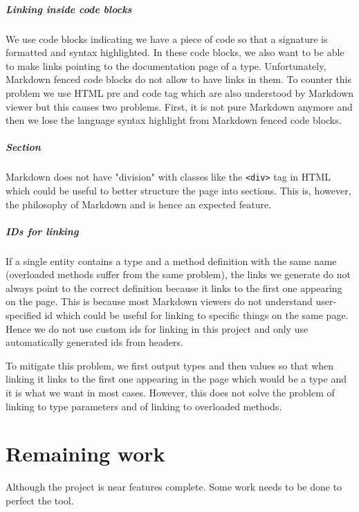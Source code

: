 \documentclass{report}
\begin{document}
\paragraph{Linking inside code blocks}
We use code blocks indicating we have a piece of code so that a signature is formatted and syntax highlighted. In these code blocks, we also want to be able to make links pointing to the documentation page of a type. Unfortunately, Markdown fenced code blocks do not allow to have links in them. To counter this problem we use HTML pre and code tag which are also understood by Markdown viewer but this causes two problems. First, it is not pure Markdown anymore and then we lose the language syntax highlight from Markdown fenced code blocks.

\paragraph{Section}
Markdown does not have "division" with classes like the \texttt{<div>} tag in HTML which could be useful to better structure the page into sections. This is, however, the philosophy of Markdown and is hence an expected feature.

\paragraph{IDs for linking}
If a single entity contains a type and a method definition with the same name (overloaded methods suffer from the same problem), the links we generate do not always point to the correct definition because it links to the first one appearing on the page. This is because most Markdown viewers do not understand user-specified id which could be useful for linking to specific things on the same page. Hence we do not use custom ids for linking in this project and only use automatically generated ids from headers.

To mitigate this problem, we first output types and then values so that when linking it links to the first one appearing in the page which would be a type and it is what we want in most cases. However, this does not solve the problem of linking to type parameters and of linking to overloaded methods.

\chapter{Remaining work}
Although the project is near features complete. Some work needs to be done to perfect the tool.
\end{document}
